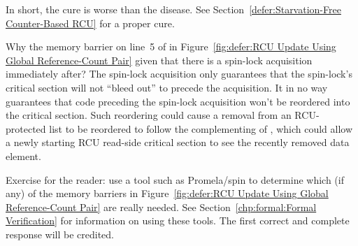 \begin{enumerate}
	In short, the cure is worse than the disease.
	See Section~\ref{defer:Starvation-Free Counter-Based RCU}
	for a proper cure.

\QuickQ{}
	Why the memory barrier on line~5 of  in
	Figure~\ref{fig:defer:RCU Update Using Global Reference-Count Pair}
	given that there is a spin-lock acquisition immediately after?
\QuickA{}
	The spin-lock acquisition only guarantees that the spin-lock's
	critical section will not ``bleed out'' to precede the
	acquisition.
	It in no way guarantees that code preceding the spin-lock
	acquisition won't be reordered into the critical section.
	Such reordering could cause a removal from an RCU-protected
	list to be reordered to follow the complementing of
	, which could allow a newly starting RCU
	read-side critical section to see the recently removed
	data element.

	Exercise for the reader: use a tool such as Promela/spin
	to determine which (if any) of the memory barriers in
	Figure~\ref{fig:defer:RCU Update Using Global Reference-Count Pair}
	are really needed.
	See Section~\ref{chp:formal:Formal Verification}
	for information on using these tools.
	The first correct and complete response will be credited.


\end{enumerate}
